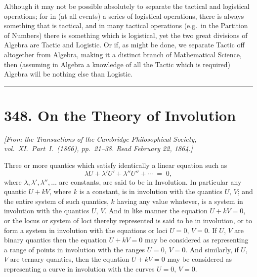 \documentclass[11pt,a4paper]{article}
\begin{document}
\medskip

Although it may not be possible absolutely to separate the tactical and logistical operations; for in (at all events) a series of logistical operations, there is always something that is tactical, and in many tactical operations (e.g.\ in the Partition of Numbers) there is something which is logistical, yet the two great divisions of Algebra are Tactic and Logistic. Or if, as might be done, we separate Tactic off altogether from Algebra, making it a distinct branch of Mathematical Science, then (assuming in Algebra a knowledge of all the Tactic which is required) Algebra will be nothing else than Logistic.

\bigskip
\noindent\rule{\textwidth}{0.4pt}
\bigskip

\section*{348. On the Theory of Involution}

\noindent\textit{[From the Transactions of the Cambridge Philosophical Society, vol.~XI.\ Part~I.\ (1866), pp.~21--38. Read February 22, 1864.]}

\medskip

Three or more quantics which satisfy identically a linear equation such as
\[
\lambda U + \lambda' U' + \lambda'' U'' + \dotsb \;=\; 0,
\]
where $\lambda, \lambda', \lambda'', \ldots$ are constants, are said to be in Involution. In particular any quantic $U + kV$, where $k$ is a constant, is in involution with the quantics $U$, $V$; and the entire system of such quantics, $k$ having any value whatever, is a system in involution with the quantics $U$, $V$. And in like manner the equation $U + kV = 0$, or the locus or system of loci thereby represented is said to be in involution, or to form a system in involution with the equations or loci $U = 0$, $V = 0$. If $U$, $V$ are binary quantics then the equation $U + kV = 0$ may be considered as representing a range of points in involution with the ranges $U = 0$, $V = 0$. And similarly, if $U$, $V$ are ternary quantics, then the equation $U + kV = 0$ may be considered as representing a curve in involution with the curves $U = 0$, $V = 0$.

\medskip
\end{document}
